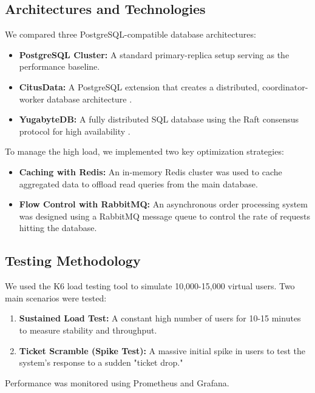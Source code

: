 \documentclass[a0,landscape]{config/poster/a0poster}
\begin{document}
\begin{multicols}{4}
    \subsection*{Architectures and Technologies}
    We compared three PostgreSQL-compatible database architectures:
    \begin{itemize}
        \item \textbf{PostgreSQL Cluster:} A standard primary-replica setup serving as the performance baseline.
        \item \textbf{CitusData:} A PostgreSQL extension that creates a distributed, coordinator-worker database architecture \cite{citus}.
        \item \textbf{YugabyteDB:} A fully distributed SQL database using the Raft consensus protocol for high availability \cite{yugabyte}.
    \end{itemize}

    To manage the high load, we implemented two key optimization strategies:
    \begin{itemize}
        \item \textbf{Caching with Redis:} An in-memory Redis cluster was used to cache aggregated data to offload read queries from the main database.
        \item \textbf{Flow Control with RabbitMQ:} An asynchronous order processing system was designed using a RabbitMQ message queue to control the rate of requests hitting the database.
    \end{itemize}

    \subsection*{Testing Methodology}
    We used the K6 load testing tool to simulate 10,000-15,000 virtual users. Two main scenarios were tested:
    \begin{enumerate}
        \item \textbf{Sustained Load Test:} A constant high number of users for 10-15 minutes to measure stability and throughput.
        \item \textbf{Ticket Scramble (Spike Test):} A massive initial spike in users to test the system's response to a sudden "ticket drop."
    \end{enumerate}
    Performance was monitored using Prometheus and Grafana.



\end{multicols}
\end{document}
